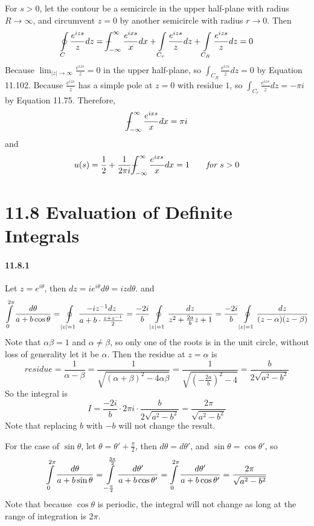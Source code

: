 \documentclass[a4paper]{article}
\begin{document}
For $s>0$, let the contour be a semicircle in the upper half-plane with radius $R\to\infty$, and circumvent $z=0$ by another semicircle with radius $r\to0$. Then
\[
\oint\displaylimits_C\frac{e^{izs}}{z}dz=\dashint_{-\infty}^\infty\frac{e^{ixs}}{x}dx+\int\displaylimits_{C_r}\frac{e^{izs}}{z}dz+\int\displaylimits_{C_R}\frac{e^{izs}}{z}dz=0
\]
Because $\lim_{|z|\to\infty}\frac{e^{izs}}{z}=0$ in the upper half-plane, so $\int_{C_R}\frac{e^{izs}}{z}dz=0$ by Equation 11.102. Because $\frac{e^{izs}}{z}$ has a simple pole at $z=0$ with residue $1$, so $\int_{C_r}\frac{e^{izs}}{z}dz=-\pi i$ by Equation 11.75. Therefore,
\[
\dashint_{-\infty}^\infty\frac{e^{ixs}}{x}dx=\pi i
\]
and
\[
u(s)=\frac{1}{2}+\frac{1}{2\pi i}\dashint_{-\infty}^\infty\frac{e^{ixs}}{x}dx=1\qquad\textit{for $s>0$}
\]

\section*{11.8 Evaluation of Definite Integrals}

\paragraph{11.8.1}
Let $z=e^{i\theta}$, then $dz=ie^{i\theta}d\theta=izd\theta$. and
\[
\int\displaylimits_{0}^{2\pi}\frac{d\theta}{a+b\cos\theta}=\oint\displaylimits_{|z|=1}\frac{-iz^{-1}dz}{a+b\cdot\frac{z+z^{-1}}{2}}=\frac{-2i}{b}\oint\displaylimits_{|z|=1}\frac{dz}{z^2+\frac{2a}{b}z+1}=\frac{-2i}{b}\oint\displaylimits_{|z|=1}\frac{dz}{(z-\alpha)(z-\beta)}
\]
Note that $\alpha\beta=1$ and $\alpha\neq\beta$, so only one of the roots is in the unit circle, without loss of generality let it be $\alpha$. Then the residue at $z=\alpha$ is
\[
residue=\frac{1}{\alpha-\beta}=\frac{1}{\sqrt{(\alpha+\beta)^2-4\alpha\beta}}=\frac{1}{\sqrt{(-\frac{2a}{b})^2-4}}=\frac{b}{2\sqrt{a^2-b^2}}
\]
So the integral is
\[
I=\frac{-2i}{b}\cdot2\pi i\cdot\frac{b}{2\sqrt{a^2-b^2}}=\frac{2\pi}{\sqrt{a^2-b^2}}
\]
Note that replacing $b$ with $-b$ will not change the result.
\medskip

For the case of $\sin\theta$, let $\theta=\theta'+\frac{\pi}{2}$, then $d\theta=d\theta'$, and $\sin\theta=\cos\theta'$, so
\[
\int\displaylimits_0^{2\pi}\frac{d\theta}{a+b\sin\theta}=\int\displaylimits_{-\frac{\pi}{2}}^{\frac{3\pi}{2}}\frac{d\theta'}{a+b\cos\theta'}=\int\displaylimits_{0}^{2\pi}\frac{d\theta'}{a+b\cos\theta'}=\frac{2\pi}{\sqrt{a^2-b^2}}
\]
Note that because $\cos\theta$ is periodic, the integral will not change as long at the range of integration is $2\pi$.
\smallskip
\end{document}

